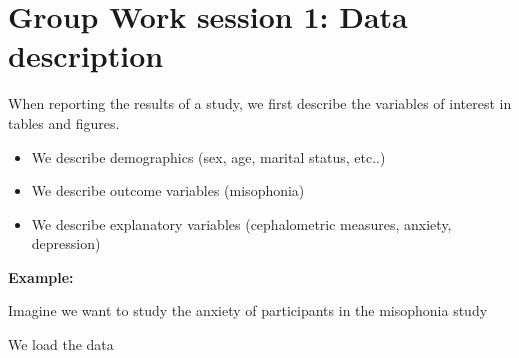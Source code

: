 \documentclass[
]{book}
\providecommand{\tightlist}{%
  \setlength{\itemsep}{0pt}\setlength{\parskip}{0pt}}
\begin{document}
\hypertarget{group-work-session-1-data-description}{%
\section{Group Work session 1: Data description}\label{group-work-session-1-data-description}}

When reporting the results of a study, we first describe the variables of interest in tables and figures.

\begin{itemize}
\tightlist
\item
  We describe demographics (sex, age, marital status, etc..)
\item
  We describe outcome variables (misophonia)
\item
  We describe explanatory variables (cephalometric measures, anxiety, depression)
\end{itemize}

\textbf{Example:}

Imagine we want to study the anxiety of participants in the misophonia study

We load the data
\end{document}

